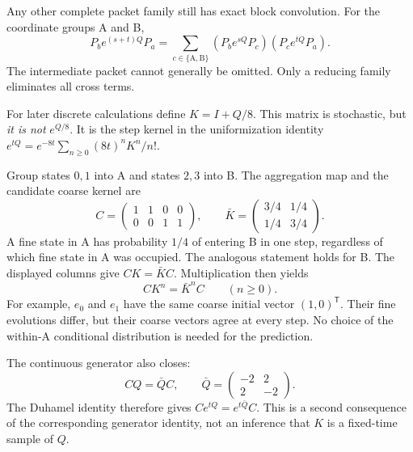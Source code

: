 Any other complete packet family still has exact block convolution. For the coordinate groups A and B,
\[
P_b e^{(s+t)Q}P_a=\sum_{c\in\{\mathrm A,\mathrm B\}}(P_b e^{sQ}P_c)(P_c e^{tQ}P_a).
\]
The intermediate packet cannot generally be omitted. Only a reducing family eliminates all cross terms.

For later discrete calculations define $K=I+Q/8$. This matrix is stochastic, but \emph{it is not} $e^{Q/8}$. It is the step kernel in the uniformization identity $e^{tQ}=e^{-8t}\sum_{n\ge0}(8t)^nK^n/n!$.

Group states $0,1$ into A and states $2,3$ into B. The aggregation map and the candidate coarse kernel are
\[
C=\begin{pmatrix}1&1&0&0\\0&0&1&1\end{pmatrix},\qquad
\bar K=\begin{pmatrix}3/4&1/4\\1/4&3/4\end{pmatrix}.
\]
A fine state in A has probability $1/4$ of entering B in one step, regardless of which fine state in A was occupied. The analogous statement holds for B.
The displayed columns give $CK=\bar KC$. Multiplication then yields
\[
CK^n=\bar K^nC\qquad(n\ge0).
\]
For example, $e_0$ and $e_1$ have the same coarse initial vector $(1,0)^{\mathsf T}$. Their fine evolutions differ, but their coarse vectors agree at every step. No choice of the within-A conditional distribution is needed for the prediction.

The continuous generator also closes:
\[
CQ=\bar Q C,\qquad
\bar Q=\begin{pmatrix}-2&2\\2&-2\end{pmatrix}.
\]
The Duhamel identity therefore gives $Ce^{tQ}=e^{t\bar Q}C$. This is a second consequence of the corresponding generator identity, not an inference that $K$ is a fixed-time sample of $Q$.

